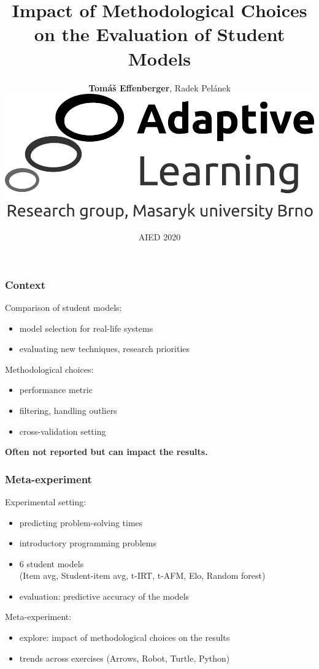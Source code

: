 \documentclass[bigger]{beamer}
\title{Impact of Methodological Choices\\on the Evaluation of Student Models}
\author{\textbf{Tom\'a\v{s} Effenberger}, Radek Pel\'anek\\[4mm]
\includegraphics[width=.35\linewidth]{figures/al-logo}\\[4mm]
}
\date{AIED 2020}
\begin{document}
\frame{\titlepage}

\begin{frame}
  \frametitle{Context}
  Comparison of student models:
  \begin{itemize}
  \item model selection for real-life systems
  \item evaluating new techniques, research priorities
  \end{itemize}

  \pause

  Methodological choices:
  \begin{itemize}
  \item performance metric
  \item filtering, handling outliers
  \item cross-validation setting
  \end{itemize}

  \pause

  \textbf{Often not reported but can impact the results.}

\end{frame}


\begin{frame}
  \frametitle{Meta-experiment}  %

  Experimental setting:
  \begin{itemize}
    \item predicting problem-solving times
    \item introductory programming problems
    \item 6 student models\\
    {\footnotesize (Item avg, Student-item avg, t-IRT, t-AFM, Elo, Random forest)}
    \item evaluation: predictive accuracy of the models %
  \end{itemize}

  \pause

  Meta-experiment:
  \begin{itemize}
    \item explore: impact of methodological choices on the results %
    \item trends across exercises (Arrows, Robot, Turtle, Python)  %
  \end{itemize}

\end{frame}
\end{document}
